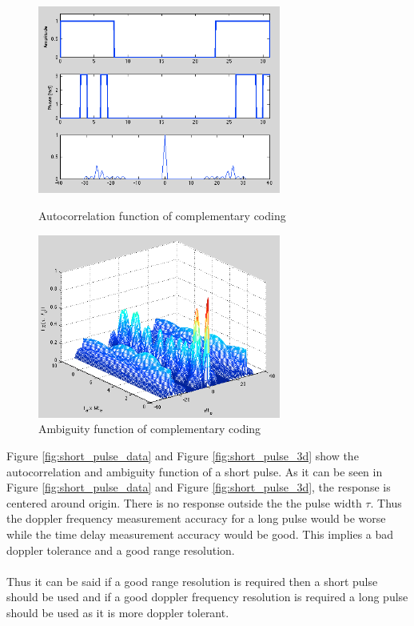 \documentclass{article}
\begin{document}
\begin{figure}[t!]
\begin{minipage}[t]{0.5\linewidth}
\centering
\includegraphics[width=8cm]{Figures/complementary_data.png}
\caption{Autocorrelation function of complementary coding}
\label{fig:complementary_data}
\end{minipage}
\begin{minipage}[t]{0.5\linewidth}
\centering
\includegraphics[width=8cm]{Figures/complementary_3d.png}
\caption{Ambiguity function of complementary coding}
\label{fig:complementary_3d}
\end{minipage}
\end{figure}
Figure \ref{fig:short_pulse_data} and Figure \ref{fig:short_pulse_3d} show the autocorrelation and ambiguity function of a short pulse. As it can be seen in Figure \ref{fig:short_pulse_data} and Figure \ref{fig:short_pulse_3d}, the response is centered around origin. There is no response outside the the pulse width $\tau$. Thus the doppler frequency measurement accuracy for a long pulse would be worse while the time delay measurement accuracy would be good. This implies a bad doppler tolerance and a good range resolution.\cite{Skolnik:2001irs}\\
\\
Thus it can be said if a good range resolution is required then a short pulse should be used and if a good doppler frequency resolution is required a long pulse should be used as it is more doppler tolerant.\\
\end{document}
